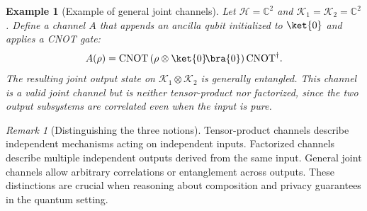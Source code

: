 \documentclass[11pt]{article}
\theoremstyle{plain}
\newtheorem{example}[theo]{Example}
\theoremstyle{remark}
\newtheorem{remark}[theo]{Remark}
\begin{document}
\begin{example}[Example of general joint channels]
Let $\mathcal{H}=\mathbb{C}^2$ and $\mathcal{K}_1=\mathcal{K}_2=\mathbb{C}^2$.
Define a channel $A$ that appends an ancilla qubit initialized to $\ket{0}$ and applies a CNOT gate:
\[
A(\rho)=\mathrm{CNOT}\,(\rho\otimes\ket{0}\!\bra{0})\,\mathrm{CNOT}^\dagger.
\]
The resulting joint output state on $\mathcal{K}_1\otimes\mathcal{K}_2$ is generally entangled.
This channel is a valid joint channel but is neither tensor-product nor factorized, since the two
output subsystems are correlated even when the input is pure.
\label{ex:general-joint}
\end{example}

\begin{remark}[Distinguishing the three notions]
Tensor-product channels describe independent mechanisms acting on independent inputs.
Factorized channels describe multiple independent outputs derived from the same input.
General joint channels allow arbitrary correlations or entanglement across outputs.
These distinctions are crucial when reasoning about composition and privacy guarantees in the
quantum setting.
\end{remark}

\end{document}
